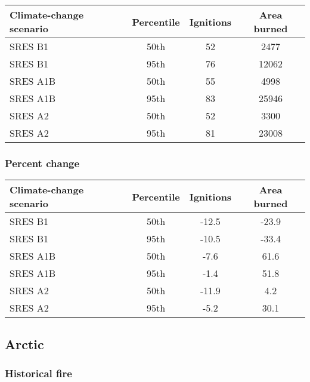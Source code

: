 \documentclass{article}\usepackage[]{graphicx}\usepackage[]{color}
\newcommand{\headcol}{\rowcolor{tableheadcolor}}
\begin{document}
\begin{table}[ht]
\centering
\begin{tabular}{lccc}
  \headcol 
 \toprule
Climate-change scenario & Percentile & Ignitions & Area burned \\ 
  \midrule
SRES B1 & 50th & 52 & 2477 \\ 
  SRES B1 & 95th & 76 & 12062 \\ 
  SRES A1B & 50th & 55 & 4998 \\ 
  SRES A1B & 95th & 83 & 25946 \\ 
  SRES A2 & 50th & 52 & 3300 \\ 
  SRES A2 & 95th & 81 & 23008 \\ 
   \bottomrule
\end{tabular}
\end{table}


\subsubsection{Percent change}

\begin{table}[ht]
\centering
\begin{tabular}{lccc}
  \headcol 
 \toprule
Climate-change scenario & Percentile & Ignitions & Area burned \\ 
  \midrule
SRES B1 & 50th & -12.5 & -23.9 \\ 
  SRES B1 & 95th & -10.5 & -33.4 \\ 
  SRES A1B & 50th & -7.6 & 61.6 \\ 
  SRES A1B & 95th & -1.4 & 51.8 \\ 
  SRES A2 & 50th & -11.9 & 4.2 \\ 
  SRES A2 & 95th & -5.2 & 30.1 \\ 
   \bottomrule
\end{tabular}
\end{table}


\newpage
\subsection{Arctic}
\subsubsection{Historical fire}
\end{document}
